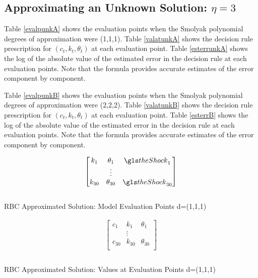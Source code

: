 \documentclass[12pt]{article}
\begin{document}
\clearpage
\subsection{Approximating an Unknown Solution: $\eta=3$ }
\label{sec:recov-unknown-solut}


Table \ref{evalpunkA} shows the evaluation points when the Smolyak polynomial 
degrees of approximation
were (1,1,1).  Table \ref{valatunkA} shows the decision rule prescription for $(c_t,k_t,\theta_t)$ at each evaluation point.   Table \ref{esterrunkA} shows the 
log of the absolute value of the estimated error in the decision rule
at each evaluation points.  Note that the formula provides accurate estimates
of the error component by component.



Table \ref{evalpunkB} shows the evaluation points when the Smolyak polynomial 
degrees of approximation
were (2,2,2).  Table \ref{valatunkB} shows the decision rule prescription for $(c_t,k_t,\theta_t)$ at each evaluation point.   Table \ref{esterrB} shows the 
log of the absolute value of the estimated error in the decision rule
at each evaluation points.  Note that the formula provides accurate estimates
of the error component by component.

 \begin{table}
   \centering
  
 \begin{gather*}
   \begin{bmatrix}
     k_1&\theta_1&\theShock_1\\
 &\vdots\\
     k_{30}&\theta_{30}&\theShock_{30}\\
   \end{bmatrix}\\
%  
 \end{gather*}\\
   \caption{RBC Approximated Solution: Model Evaluation Points \label{evalpunkA} d=(1,1,1)}
 \end{table}


\begin{table}
  \centering
  
\begin{gather*}
  \begin{bmatrix}
    c_1&k_1&\theta_1\\
&\vdots\\
    c_{30}&k_{30}&\theta_{30}\\
  \end{bmatrix}\\
%  
\end{gather*}\\
  \caption{RBC Approximated Solution: Values at Evaluation Points \label{valatunkA} d=(1,1,1)}
\end{table}
\end{document}
